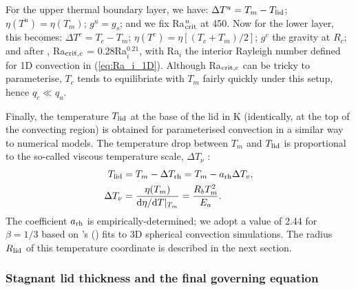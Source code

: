\documentclass[trackchanges]{aastex63}
\begin{document}
For the upper thermal boundary layer, we have: $\Delta T^u = T_m - T_{\rm lid}$; $\eta(T^u) = \eta(T_m)$; $g^u = g_s$; and we fix Ra$^u_{{\rm crit}}$ at 450. Now for the lower layer, this becomes: $\Delta T^c = T_c - T_m$; $\eta(T^c) = \eta[(T_c + T_m)/2]$; $g^c$ the gravity at $R_c$; and after \citet{deschamps_inversion_2000}, Ra$_{{\rm crit}, c}$ = 0.28Ra$_i^{0.21}$, with Ra$_i$ the interior Rayleigh number defined for 1D convection in (\ref{eq:Ra_i_1D}). Although Ra$_{{\rm crit}, c}$ can be tricky to parameterise, $T_c$ tends to equilibriate with $T_m$ fairly quickly under this setup, hence $q_c \ll q_u$.

Finally, the temperature $T_{\rm lid}$ at the base of the lid in K (identically, at the top of the convecting region) is obtained for parameterised convection in a similar way to numerical models. The temperature drop between $T_m$ and $T_{\rm lid}$ is proportional to the so-called viscous temperature scale, $\Delta T_\nu$ \citep{davaille_transient_1993}:
\begin{align}
\label{eq:Tl}
T_{\rm lid} &= T_m - \Delta T_{\rm rh} = T_m - a_{\rm rh} \Delta T_{v},\\
\label{eq:T_rh}
\Delta T_\nu &= \frac{\eta(T_m)}{{\rm d}\eta/{\rm d}T\vert_{T_m}} = \frac{R_b T_m^2}{E_a}.
\end{align}
The coefficient $a_{\rm rh}$ is empirically-determined; we adopt a value of 2.44 for $\beta = 1/3$ based on \citeauthor{thiriet_scaling_2019}'s (\citeyear{thiriet_scaling_2019}) fits to 3D spherical convection simulations. The radius $R_{\rm lid}$ of this temperature coordinate is described in the next section.



\subsubsection{Stagnant lid thickness and the final governing equation}\label{sec:methods-lid1D}
\end{document}
